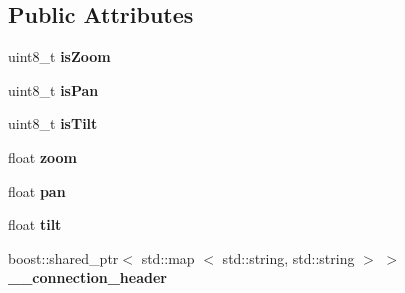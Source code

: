 \subsection*{\-Public \-Attributes}
\begin{DoxyCompactItemize}
\item 
\hypertarget{struct_c_i_t_i_u_s___control___communication_1_1msg__ctrl_front_camera___a908486ad34f1624651f31f5e3072c0b4}{uint8\-\_\-t {\bfseries is\-Zoom}}\label{struct_c_i_t_i_u_s___control___communication_1_1msg__ctrl_front_camera___a908486ad34f1624651f31f5e3072c0b4}

\item 
\hypertarget{struct_c_i_t_i_u_s___control___communication_1_1msg__ctrl_front_camera___a53b274abc26c804c4d1a4a265d33ee86}{uint8\-\_\-t {\bfseries is\-Pan}}\label{struct_c_i_t_i_u_s___control___communication_1_1msg__ctrl_front_camera___a53b274abc26c804c4d1a4a265d33ee86}

\item 
\hypertarget{struct_c_i_t_i_u_s___control___communication_1_1msg__ctrl_front_camera___a87be16eab77b8435f9641c7266954333}{uint8\-\_\-t {\bfseries is\-Tilt}}\label{struct_c_i_t_i_u_s___control___communication_1_1msg__ctrl_front_camera___a87be16eab77b8435f9641c7266954333}

\item 
\hypertarget{struct_c_i_t_i_u_s___control___communication_1_1msg__ctrl_front_camera___ac7701ce2b005e90cab283c9538560edf}{float {\bfseries zoom}}\label{struct_c_i_t_i_u_s___control___communication_1_1msg__ctrl_front_camera___ac7701ce2b005e90cab283c9538560edf}

\item 
\hypertarget{struct_c_i_t_i_u_s___control___communication_1_1msg__ctrl_front_camera___acdcc5ed16b4c1f714d31338b42597982}{float {\bfseries pan}}\label{struct_c_i_t_i_u_s___control___communication_1_1msg__ctrl_front_camera___acdcc5ed16b4c1f714d31338b42597982}

\item 
\hypertarget{struct_c_i_t_i_u_s___control___communication_1_1msg__ctrl_front_camera___a264c2da052ceee7f77d3a17cfe93e10c}{float {\bfseries tilt}}\label{struct_c_i_t_i_u_s___control___communication_1_1msg__ctrl_front_camera___a264c2da052ceee7f77d3a17cfe93e10c}

\item 
\hypertarget{struct_c_i_t_i_u_s___control___communication_1_1msg__ctrl_front_camera___abe0cdeb618f3dd6af41298f610963f45}{boost\-::shared\-\_\-ptr$<$ std\-::map\*
$<$ std\-::string, std\-::string $>$ $>$ {\bfseries \-\_\-\-\_\-connection\-\_\-header}}\label{struct_c_i_t_i_u_s___control___communication_1_1msg__ctrl_front_camera___abe0cdeb618f3dd6af41298f610963f45}

\end{DoxyCompactItemize}
